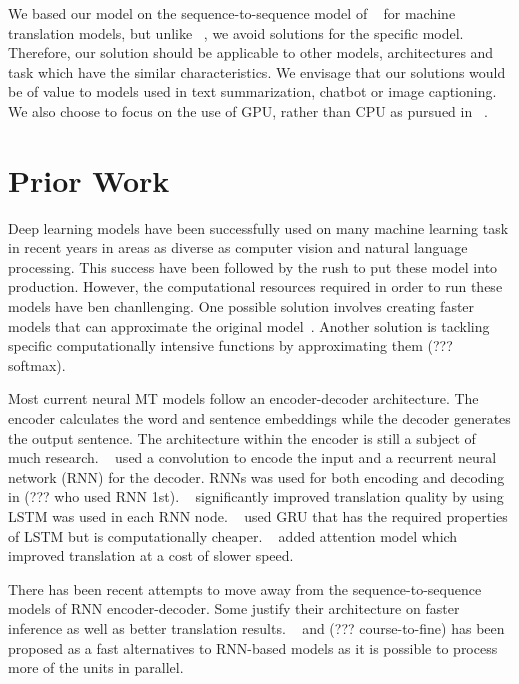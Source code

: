\documentclass[11pt,a4paper]{article}
\begin{document}
We based our model on the sequence-to-sequence model of ~\cite{D14-1179} for machine translation models, but unlike ~\cite{DBLP:conf/emnlp/Devlin17}, we avoid solutions for the specific model. Therefore, our solution should be applicable to other models, architectures and task which have the similar characteristics. We envisage that our solutions would be of value to models used in text summarization, chatbot or image captioning. We also choose to focus on the use of GPU, rather than CPU as pursued in ~\cite{DBLP:conf/emnlp/Devlin17}.

\section{Prior Work}

Deep learning models have been successfully used on many machine learning task in recent years in areas as diverse as computer vision and natural language processing. This success have been followed by the rush to put these model into production. However, the computational resources required in order to run these models have ben chanllenging. One possible solution involves creating faster models that can approximate the original model~\citep{DBLP:conf/emnlp/KimR16}. Another solution is tackling specific computationally intensive functions by approximating them (??? softmax). 

Most current neural MT models follow an encoder-decoder architecture. The encoder calculates the word and sentence embeddings while the decoder generates the output sentence. The architecture within the encoder is still a subject of much research. ~\cite{kalchbrenner13emnlp} used a convolution to encode the input and a recurrent neural network (RNN) for the decoder. RNNs was used for both encoding and decoding in (??? who used RNN 1st). ~\cite{Sutskever:2014:SSL:2969033.2969173} significantly improved translation quality by using LSTM was used in each RNN node. ~\cite{D14-1179} used GRU that has the required properties of LSTM but is computationally cheaper. ~\cite{DBLP:journals/corr/BahdanauCB14} added attention model which improved translation at a cost of slower speed.

There has been recent attempts to move away from the sequence-to-sequence models of RNN encoder-decoder. Some justify their architecture on faster inference as well as better translation results. ~\cite{DBLP:journals/corr/VaswaniSPUJGKP17} and (??? course-to-fine) has been proposed as a fast alternatives to RNN-based models as it is possible to process more of the units in parallel.
\end{document}
